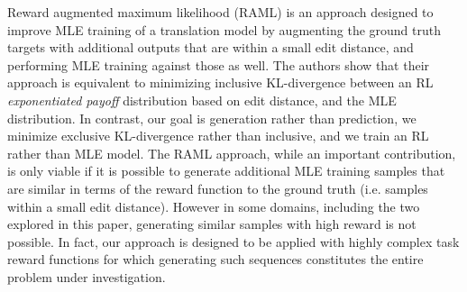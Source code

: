 Reward augmented maximum likelihood (RAML) \citep{norouzi2016reward} is an approach designed to improve MLE training of a translation model by augmenting the ground truth targets with additional outputs that are within a small edit distance, and performing MLE training against those as well. The authors show that their approach is equivalent to minimizing inclusive KL-divergence between an RL \emph{exponentiated payoff} distribution based on edit distance, and the MLE distribution. In contrast, our goal is generation rather than prediction, we minimize exclusive KL-divergence rather than inclusive, and we train an RL rather than MLE model. The RAML approach, while an important contribution, is only viable if it is possible to generate additional MLE training samples that are similar in terms of the reward function to the ground truth (i.e. samples within a small edit distance). However in some domains, including the two explored in this paper, generating similar samples with high reward is not possible. In fact, our approach is designed to be applied with highly complex task reward functions for which generating such sequences constitutes the entire problem under investigation.

